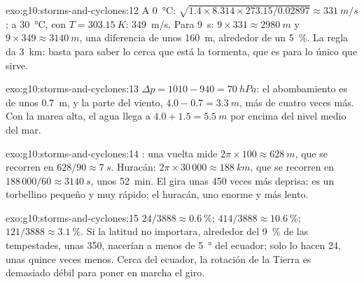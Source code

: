 \begin{solution}{exo:g10:storms-and-cyclones:12}
A \qty{0}{\degreeCelsius}: $\sqrt{1.4 \times 8.314 \times 273.15/0.02897}
\approx \qty{331}{m/s}$; a \qty{30}{\degreeCelsius}, con $T =
\qty{303.15}{K}$: \qty{349}{m/s}. Para \qty{9}{s}: $9 \times 331 \approx
\qty{2980}{m}$ y $9 \times 349 \approx \qty{3140}{m}$, una diferencia de unos
\qty{160}{m}, alrededor de un \qty{5}{\percent}. La regla da \qty{3}{km}:
basta para saber lo cerca que está la tormenta, que es para lo único que
sirve.
\end{solution}

\begin{solution}{exo:g10:storms-and-cyclones:13}
$\Delta p = 1010 - 940 = \qty{70}{hPa}$: el abombamiento es de unos
\qty{0.7}{m}, y la parte del viento, $4.0 - 0.7 = \qty{3.3}{m}$, más de
cuatro veces más. Con la marea alta, el agua llega a $4.0 + 1.5 = \qty{5.5}{m}$ por encima del nivel medio del mar.
\end{solution}

\begin{solution}{exo:g10:storms-and-cyclones:14}
: una vuelta mide $2\pi \times 100 \approx \qty{628}{m}$, que se
recorren en $628/90 \approx \qty{7}{s}$. Huracán: $2\pi \times 30\,000 \approx
\qty{188}{km}$, que se recorren en $188\,000/60 \approx \qty{3140}{s}$, unos \qty{52}{min}. El  gira unas 450 veces más
deprisa: es un torbellino pequeño y muy rápido; el huracán, uno enorme y más
lento.
\end{solution}

\begin{solution}{exo:g10:storms-and-cyclones:15}
$24/3888 \approx \qty{0.6}{\percent}$; $414/3888 \approx
\qty{10.6}{\percent}$; $121/3888 \approx \qty{3.1}{\percent}$. Si la latitud
no importara, alrededor del \qty{9}{\percent} de las tempestades, unas 350,
nacerían a menos de \qty{5}{\degree} del ecuador; solo lo hacen 24, unas
quince veces menos. Cerca del ecuador, la rotación de la Tierra es demasiado
débil para poner en marcha el giro.
\end{solution}

